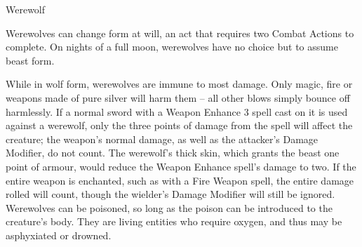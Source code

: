 \begin{monsterbox}{Werewolf}
	\begin{rpg-monsteraction}[Shapeshift]
		Werewolves can change form at will, an act that requires two Combat Actions to complete. On nights of a full moon, werewolves have no choice but to assume beast form.
	\end{rpg-monsteraction}
	\begin{rpg-monsteraction}
		While in wolf form, werewolves are immune to most damage. Only magic, fire or weapons made of pure silver will harm them – all other blows simply bounce off harmlessly. If a normal sword with a Weapon Enhance 3 spell cast on it is used against a werewolf, only the three points of damage from the spell will affect the creature; the weapon’s normal damage, as well as the attacker’s Damage Modifier, do not count. The werewolf’s thick skin, which grants the beast one point of armour, would reduce the Weapon Enhance spell’s damage to two. If the entire weapon is enchanted, such as with a Fire Weapon spell, the entire damage rolled will count, though the wielder’s Damage Modifier will still be ignored. Werewolves can be poisoned, so long as the poison can be introduced to the creature’s body. They are living entities who require oxygen, and thus may be asphyxiated or drowned.
	\end{rpg-monsteraction}

\end{monsterbox}



